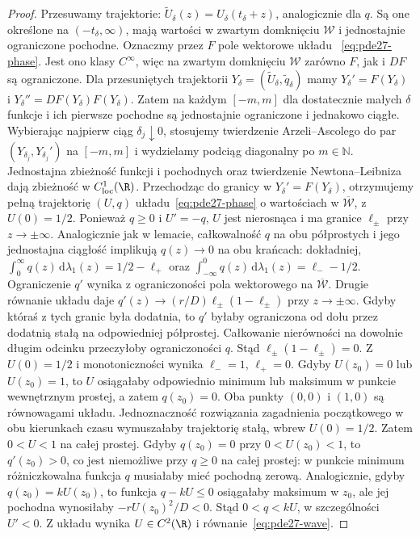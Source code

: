 \begin{proof}
Przesuwamy trajektorie: $\widetilde U_\delta(z)
=U_\delta(t_\delta+z)$, analogicznie dla $q$.
Są one określone na $(-t_\delta,\infty)$,
mają wartości w zwartym domknięciu $\mathcal W$
i jednostajnie ograniczone pochodne.
Oznaczmy przez $F$ pole wektorowe układu
~\eqref{eq:pde27-phase}. Jest ono klasy $C^\infty$,
więc na zwartym domknięciu $\mathcal W$ zarówno $F$,
jak i $DF$ są ograniczone. Dla przesuniętych trajektorii
$Y_\delta=(\widetilde U_\delta,\widetilde q_\delta)$
mamy $Y_\delta'=F(Y_\delta)$ i
$Y_\delta''=DF(Y_\delta)F(Y_\delta)$.
Zatem na każdym $[-m,m]$ dla dostatecznie małych $\delta$
funkcje i ich pierwsze pochodne są jednostajnie
ograniczone i jednakowo ciągłe.
Wybierając najpierw ciąg $\delta_j\downarrow0$,
stosujemy twierdzenie Arzeli--Ascolego do par
$(Y_{\delta_j},Y_{\delta_j}')$ na $[-m,m]$
i wydzielamy podciąg diagonalny po $m\in\mathbb N$.
Jednostajna zbieżność funkcji i pochodnych
oraz twierdzenie Newtona--Leibniza dają zbieżność
w $C^1_{\mathrm{loc}}(\R)$. Przechodząc do granicy
w $Y_\delta'=F(Y_\delta)$, otrzymujemy pełną
trajektorię $(U,q)$ układu~\eqref{eq:pde27-phase}
o wartościach w $\overline{\mathcal W}$, z $U(0)=1/2$. Ponieważ $q\ge0$ i $U'=-q$,
$U$ jest nierosnąca i ma granice $\ell_\pm$
przy $z\to\pm\infty$. Analogicznie jak w lemacie,
całkowalność $q$ na obu półprostych i jego
jednostajna ciągłość implikują $q(z)\to0$
na obu krańcach: dokładniej,
$\int_0^\infty q(z)\,\mathrm d\lambda_1(z)=1/2-\ell_+$ oraz
$\int_{-\infty}^0 q(z)\,\mathrm d\lambda_1(z)=\ell_--1/2$.
Ograniczenie $q'$ wynika z ograniczoności pola
wektorowego na $\overline{\mathcal W}$.
Drugie równanie układu daje
$q'(z)\to (r/D)\ell_\pm(1-\ell_\pm)$
przy $z\to\pm\infty$. Gdyby któraś z tych granic
była dodatnia, to $q'$ byłaby ograniczona od dołu
przez dodatnią stałą na odpowiedniej półprostej.
Całkowanie nierówności na dowolnie długim odcinku
przeczyłoby ograniczoności $q$. Stąd
$\ell_\pm(1-\ell_\pm)=0$.
Z $U(0)=1/2$ i monotoniczności wynika
$\ell_-=1$, $\ell_+=0$.
Gdyby $U(z_0)=0$ lub $U(z_0)=1$, to $U$
osiągałaby odpowiednio minimum lub maksimum
w punkcie wewnętrznym prostej, a zatem $q(z_0)=0$.
Oba punkty $(0,0)$ i $(1,0)$ są równowagami
układu. Jednoznaczność rozwiązania zagadnienia
początkowego w obu kierunkach czasu wymuszałaby
trajektorię stałą, wbrew $U(0)=1/2$.
Zatem $0<U<1$ na całej prostej.
Gdyby $q(z_0)=0$ przy $0<U(z_0)<1$,
to $q'(z_0)>0$, co jest niemożliwe przy $q\ge0$
na całej prostej: w punkcie minimum
różniczkowalna funkcja $q$ musiałaby mieć
pochodną zerową. Analogicznie, gdyby
$q(z_0)=kU(z_0)$, to funkcja $q-kU\le0$
osiągałaby maksimum w $z_0$, ale jej pochodna
wynosiłaby $-rU(z_0)^2/D<0$.
Stąd $0<q<kU$, w szczególności $U'<0$.
Z układu wynika $U\in C^2(\R)$ i
równanie~\eqref{eq:pde27-wave}.


\end{proof}
